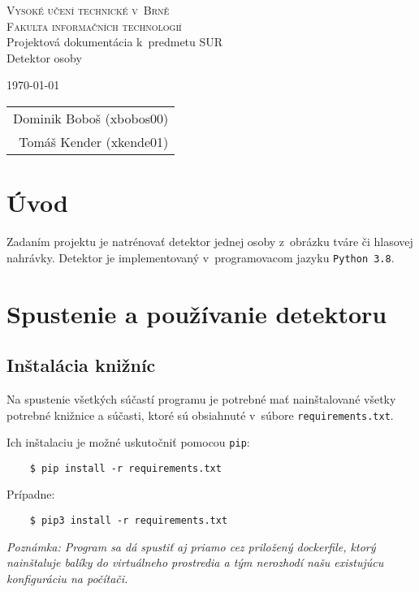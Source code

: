 \documentclass[11pt, a4paper]{article}
\begin{document}
	\begin{titlepage}
		\begin{center}
			\Huge
			\textsc{Vysoké učení technické v~Brně} \\
			\huge
			\textsc{Fakulta informačních technologií} \\
			\LARGE
			Projektová dokumentácia k~predmetu SUR \\
			\Huge
			Detektor osoby
		\end{center}

		{\Large
			\today
			\hfill
			\begin{tabular}{r}
			Dominik Boboš (xbobos00) \\
			Tomáš Kender (xkende01)
			\end{tabular}
		}
	\end{titlepage}
	
	\section{Úvod}
	Zadaním projektu je natrénovať detektor jednej osoby z~obrázku tváre či hlasovej nahrávky. Detektor je implementovaný v~programovacom jazyku \texttt{Python\,3.8}. 
	
	\section{Spustenie a používanie detektoru}
		\subsection{Inštalácia knižníc}
	Na spustenie všetkých súčastí programu je potrebné mať nainštalované všetky potrebné knižnice a súčasti, ktoré sú obsiahnuté v~súbore \texttt{requirements.txt}. 
	
	Ich inštalaciu je možné uskutočniť pomocou \texttt{pip}:
			\begin{verbatim}
    $ pip install -r requirements.txt
			\end{verbatim}
			
	Prípadne:
			\begin{verbatim}
    $ pip3 install -r requirements.txt
			\end{verbatim}
			\emph{Poznámka: Program sa dá spustiť aj priamo cez priložený dockerfile, ktorý nainštaluje balíky do virtuálneho prostredia a tým nerozhodí našu existujúcu konfiguráciu na počítači.}
\end{document}
